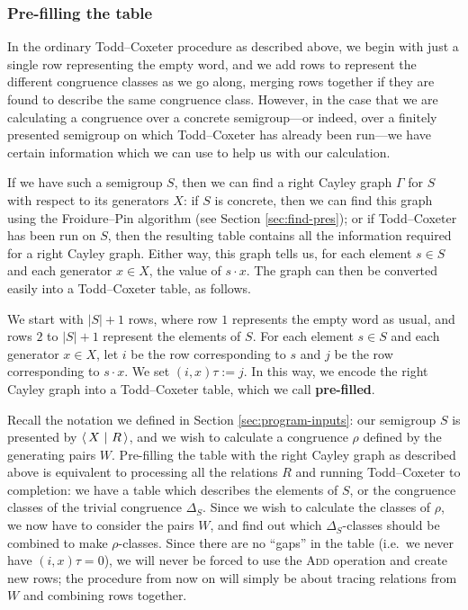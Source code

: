 \subsubsection{Pre-filling the table}
\label{sec:tc-prefill}
In the ordinary Todd--Coxeter procedure as described above, we begin with just a
single row representing the empty word, and we add rows to represent the
different congruence classes as we go along, merging rows together if they are
found to describe the same congruence class.  However, in the case that we are
calculating a congruence over a concrete semigroup---or indeed, over a finitely
presented semigroup on which Todd--Coxeter has already been run---we have certain
information which we can use to help us with our calculation.

If we have such a semigroup $S$, then we can find a right Cayley graph $\Gamma$
for $S$ with respect to its generators $X$: if $S$ is concrete, then we can find
this graph using the Froidure--Pin algorithm (see Section \ref{sec:find-pres});
or if Todd--Coxeter has been run on $S$, then the resulting table contains all
the information required for a right Cayley graph.  Either way, this graph tells us, for
each element $s \in S$ and each generator $x \in X$, the value of $s \cdot x$.
The graph can then be converted easily into a Todd--Coxeter table, as follows.

We start with $|S| + 1$
rows, where row $1$ represents the empty word as usual, and rows $2$ to $|S| + 1$
represent the elements of $S$.  For each element $s \in S$ and each generator
$x \in X$, let $i$ be the row corresponding to $s$ and $j$ be the row
corresponding to $s \cdot x$.  We set $(i, x)\tau := j$.  In this way, we encode
the right Cayley graph into a Todd--Coxeter table, which we call
\textbf{pre-filled}.

Recall the notation we defined in Section \ref{sec:program-inputs}: our
semigroup $S$ is presented by $\left\langle\,X ~\middle|~ R\,\right\rangle$, and we wish to calculate a congruence
$\rho$ defined by the generating pairs $W$.  Pre-filling the table with the
right Cayley graph as described above is equivalent to processing all the
relations $R$ and running Todd--Coxeter to completion: we have a table which
describes the elements of $S$, or the congruence classes of the trivial
congruence $\Delta_S$.  Since we wish to calculate the classes of $\rho$, we now
have to consider the pairs $W$, and find out which $\Delta_S$-classes should be
combined to make $\rho$-classes.  Since there are no ``gaps'' in the table (i.e.~we never have
$(i,x)\tau=0$), we will never be forced to use the \textsc{Add} operation and
create new rows; the procedure from now on will simply be about tracing
relations from $W$ and combining rows together.

